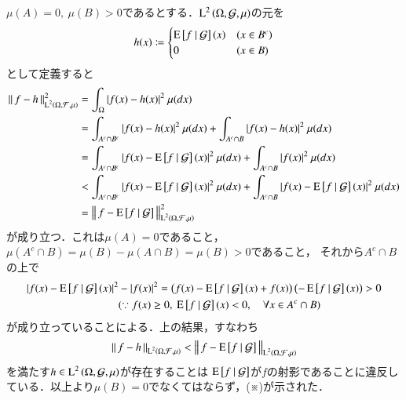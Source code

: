 \begin{prf}
\begin{description}
				$\mu(A) = 0,\ \mu(B) > 0$であるとする．$\operatorname{L}^{2} \left(\Omega, \mathcal{G},\mu\right)$の元を
				\begin{align}
					h(x) \coloneqq
					\begin{cases}
						\operatorname{E} \left[ f \ \middle|\ \mathcal{G} \right](x) & (x \in B^c) \\
						0 & (x \in B)
					\end{cases}
				\end{align}
				として定義すると
				\begin{align}
					\Norm{f - h}{\Lp{2}{\Omega, \mathcal{F},\mu}}^2 &= \int_{\Omega} |f(x) - h(x)|^2\ \mu(dx) \\
					&= \int_{A^c \cap B^c} |f(x) - h(x)|^2\ \mu(dx) + \int_{A^c \cap B} |f(x) - h(x)|^2\ \mu(dx) \\
					&= \int_{A^c \cap B^c} |f(x) - \cexp{f}{\mathcal{G}}(x)|^2\ \mu(dx) + \int_{A^c \cap B} |f(x)|^2\ \mu(dx) \\
					&< \int_{A^c \cap B^c} |f(x) - \cexp{f}{\mathcal{G}}(x)|^2\ \mu(dx) + \int_{A^c \cap B} |f(x) - \cexp{f}{\mathcal{G}}(x)|^2\ \mu(dx) \\
					&= \Norm{f - \cexp{f}{\mathcal{G}}}{\Lp{2}{\Omega, \mathcal{F},\mu}}^2
				\end{align}
				が成り立つ．これは$\mu(A) = 0$であること，$\mu(A^c \cap B) = \mu(B) - \mu(A \cap B) = \mu(B) > 0$であること，
				それから$A^c \cap B$の上で
				\begin{align}
					|f(x) - \cexp{f}{\mathcal{G}}(x)|^2 &- |f(x)|^2 = \left(f(x) - \cexp{f}{\mathcal{G}}(x) + f(x)\right)\left(- \cexp{f}{\mathcal{G}}(x)\right) > 0 \\
					&(\because f(x) \geq 0,\ \cexp{f}{\mathcal{G}}(x) < 0, \quad \forall x \in A^c \cap B)
				\end{align}
				が成り立っていることによる．上の結果，すなわち
				\begin{align}
					\left\|\, f - h\, \right\|_{\operatorname{L}^{2} \left(\Omega, \mathcal{F},\mu\right)} < \left\|\, f - \operatorname{E} \left[ f \ \middle|\ \mathcal{G} \right]\, \right\|_{\operatorname{L}^{2} \left(\Omega, \mathcal{F},\mu\right)}
				\end{align}
				を満たす$h \in \operatorname{L}^{2} \left(\Omega, \mathcal{G},\mu\right)$が存在することは
				$\operatorname{E} \left[ f \ \middle|\ \mathcal{G} \right]$が$f$の射影であることに違反している．以上より$\mu(B) = 0$でなくてはならず，(※)が示された．
			

\end{description}
\end{prf}
